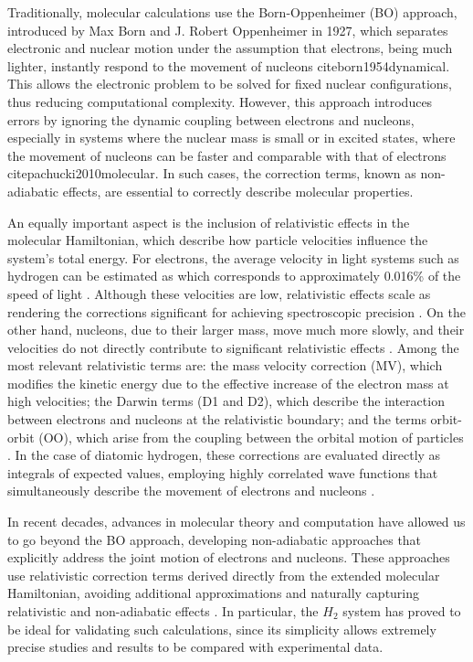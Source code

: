\documentclass[%
 reprint,
 amsmath,amssymb,
 aps,
]{revtex4-2}
\begin{document}
Traditionally, molecular calculations use the Born-Oppenheimer (BO) approach, introduced by Max Born and J. Robert Oppenheimer in 1927, which separates electronic and nuclear motion under the assumption that electrons, being much lighter, instantly respond to the movement of nucleons cite{born1954dynamical}. This allows the electronic problem to be solved for fixed nuclear configurations, thus reducing computational complexity. However, this approach introduces errors by ignoring the dynamic coupling between electrons and nucleons, especially in systems where the nuclear mass is small or in excited states, where the movement of nucleons can be faster and comparable with that of electrons cite{pachucki2010molecular}. In such cases, the correction terms, known as non-adiabatic effects, are essential to correctly describe molecular properties.

An equally important aspect is the inclusion of relativistic effects in the molecular Hamiltonian, which describe how particle velocities influence the system's total energy. For electrons, the average velocity in light systems such as hydrogen can be estimated as which corresponds to approximately 0.016\% of the speed of light \cite{born1954dynamical}. Although these velocities are low, relativistic effects scale as rendering the corrections significant for achieving spectroscopic precision \cite{stanke2013relativistic}. On the other hand, nucleons, due to their larger mass, move much more slowly, and their velocities do not directly contribute to significant relativistic effects \cite{pachucki2010molecular}. Among the most relevant relativistic terms are: the mass velocity correction (MV), which modifies the kinetic energy due to the effective increase of the electron mass at high velocities; the Darwin terms (D1 and D2), which describe the interaction between electrons and nucleons at the relativistic boundary; and the terms orbit-orbit (OO), which arise from the coupling between the orbital motion of particles \cite{kinoshita1995high}. In the case of diatomic hydrogen, these corrections are evaluated directly as integrals of expected values, employing highly correlated wave functions that simultaneously describe the movement of electrons and nucleons \cite{stanke2013relativistic}.

In recent decades, advances in molecular theory and computation have allowed us to go beyond the BO approach, developing non-adiabatic approaches that explicitly address the joint motion of electrons and nucleons. These approaches use relativistic correction terms derived directly from the extended molecular Hamiltonian, avoiding additional approximations and naturally capturing relativistic and non-adiabatic effects \cite{pachucki2010molecular}. In particular, the $H_2$ system has proved to be ideal for validating such calculations, since its simplicity allows extremely precise studies and results to be compared with experimental data.
\end{document}
